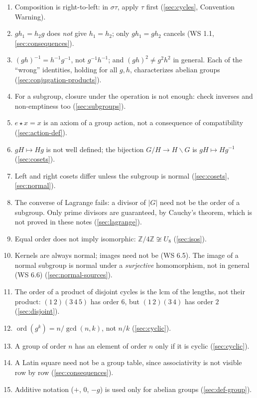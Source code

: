 \documentclass[11pt]{report}
\begin{document}
\begin{enumerate}
    \item Composition is right-to-left: in $\sigma\tau$, apply $\tau$ first (\ref{sec:cycles}, Convention Warning).
    \item $gh_1 = h_2g$ does \emph{not} give $h_1 = h_2$; only $gh_1 = gh_2$ cancels (WS 1.1, \ref{sec:consequences}).
    \item $(gh)^{-1} = h^{-1}g^{-1}$, not $g^{-1}h^{-1}$; and $(gh)^2 \neq g^2h^2$ in general. Each of the ``wrong'' identities, holding for all $g, h$, characterizes abelian groups (\ref{sec:conjugation-products}).
    \item For a subgroup, closure under the operation is not enough: check inverses and non-emptiness too (\ref{sec:subgroups}).
    \item $e \star x = x$ is an axiom of a group action, not a consequence of compatibility (\ref{sec:action-def}).
    \item $gH \mapsto Hg$ is not well defined; the bijection $G/H \to H\backslash G$ is $gH \mapsto Hg^{-1}$ (\ref{sec:cosets}).
    \item Left and right cosets differ unless the subgroup is normal (\ref{sec:cosets}, \ref{sec:normal}).
    \item The converse of Lagrange fails: a divisor of $|G|$ need not be the order of a subgroup. Only prime divisors are guaranteed, by Cauchy's theorem, which is not proved in these notes (\ref{sec:lagrange}).
    \item Equal order does not imply isomorphic: $\mathbb{Z}/4\mathbb{Z} \not\cong U_8$ (\ref{sec:isos}).
    \item Kernels are always normal; images need not be (WS 6.5). The image of a normal subgroup is normal under a \emph{surjective} homomorphism, not in general (WS 6.6) (\ref{sec:normal-sources}).
    \item The order of a product of disjoint cycles is the lcm of the lengths, not their product: $(1\,2)(3\,4\,5)$ has order $6$, but $(1\,2)(3\,4)$ has order $2$ (\ref{sec:disjoint}).
    \item $\operatorname{ord}(g^k) = n/\gcd(n, k)$, not $n/k$ (\ref{sec:cyclic}).
    \item A group of order $n$ has an element of order $n$ only if it is cyclic (\ref{sec:cyclic}).
    \item A Latin square need not be a group table, since associativity is not visible row by row (\ref{sec:consequences}).
    \item Additive notation ($+$, $0$, $-g$) is used only for abelian groups (\ref{sec:def-group}).

\end{enumerate}
\end{document}
